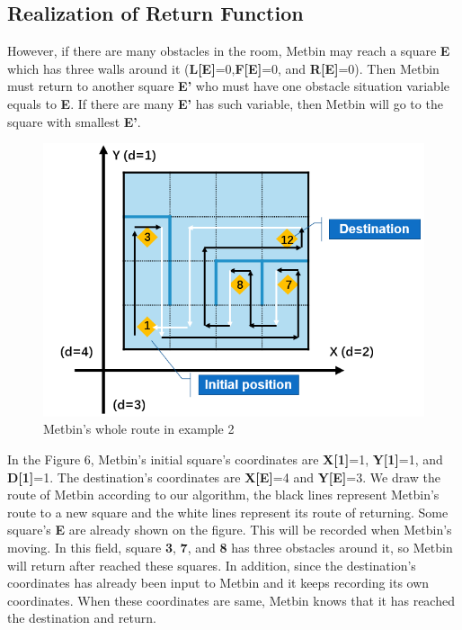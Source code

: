 \documentclass[12pt]{article}
\begin{document}
\subsection{Realization of Return Function}
However, if there are many obstacles in the room, Metbin may reach a square \textbf{E} which has three walls around it (\textbf{L[E]}=0,\textbf{F[E]}=0, and \textbf{R[E]}=0). Then Metbin must return to another square \textbf{E'} who must have one obstacle situation variable equals to \textbf{E}. If there are many \textbf{E'} has such variable, then Metbin will go to the square with smallest \textbf{E'}.
\begin{figure}[H]
\centering
\includegraphics[scale=0.7]{P6.jpg}
\caption{Metbin's whole route in example 2}
\end{figure}
In the Figure 6, Metbin's initial square's coordinates are \textbf{X[1]}=1, \textbf{Y[1]}=1, and \textbf{D[1]}=1. The destination's coordinates are \textbf{X[E]}=4 and \textbf{Y[E]}=3. 
We draw the route of Metbin according to our algorithm, the black lines represent Metbin's route to a new square and the white lines represent its route of returning. Some square's \textbf{E} are already shown on the figure. This will be recorded when Metbin's moving. In this field, square \textbf{3}, \textbf{7}, and \textbf{8} has three obstacles around it, so Metbin will return after reached these squares. In addition, since the destination's coordinates has already been input to Metbin and it keeps recording its own coordinates. When these coordinates are same, Metbin knows that it has reached the destination and return.
\end{document}
